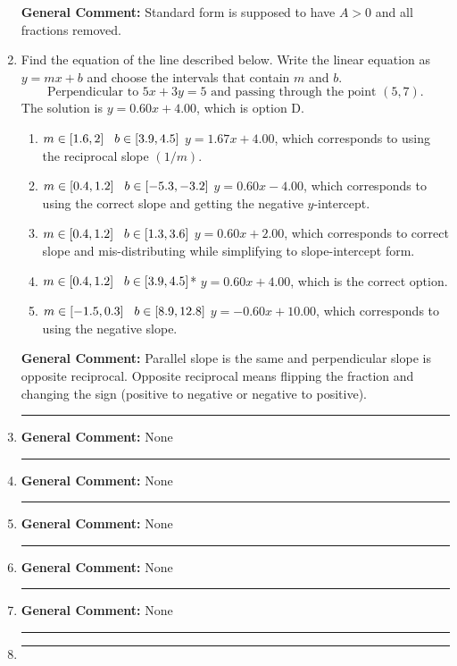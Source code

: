\documentclass{extbook}[14pt]
\newcommand{\litem}[1]{\item#1\hspace*{-1cm}\rule{\textwidth}{0.4pt}}
\begin{document}
\begin{enumerate}
{\textbf{General Comment:} Standard form is supposed to have $A > 0$ and all fractions removed.
}
\litem{
Find the equation of the line described below. Write the linear equation as $ y=mx+b $ and choose the intervals that contain $m$ and $b$.
\[ \text{Perpendicular to } 5 x + 3 y = 5 \text{ and passing through the point } (5, 7). \]
The solution is \( y = 0.60x + 4.00 \), which is option D.\begin{enumerate}[label=\Alph*.]
\item \( m \in [1.6, 2] \hspace*{3mm} b \in [3.9, 4.5] \) $y = 1.67x + 4.00$, which corresponds to using the reciprocal slope $(1/m)$.
\item \( m \in [0.4, 1.2] \hspace*{3mm} b \in [-5.3, -3.2] \) $y = 0.60x - 4.00$, which corresponds to using the correct slope and getting the negative $y$-intercept.
\item \( m \in [0.4, 1.2] \hspace*{3mm} b \in [1.3, 3.6] \) $y = 0.60x + 2.00$, which corresponds to correct slope and mis-distributing while simplifying to slope-intercept form.
\item \( m \in [0.4, 1.2] \hspace*{3mm} b \in [3.9, 4.5] \)* $y = 0.60x + 4.00$, which is the correct option.
\item \( m \in [-1.5, 0.3] \hspace*{3mm} b \in [8.9, 12.8] \) $y = -0.60x + 10.00$, which corresponds to using the negative slope.
\end{enumerate}

\textbf{General Comment:} Parallel slope is the same and perpendicular slope is opposite reciprocal. Opposite reciprocal means flipping the fraction and changing the sign (positive to negative or negative to positive).
}
\litem{



\textbf{General Comment:} None
}
\litem{



\textbf{General Comment:} None
}
\litem{



\textbf{General Comment:} None
}
\litem{



\textbf{General Comment:} None
}
\litem{



\textbf{General Comment:} None
}
\litem{



}
\end{enumerate}
\end{document}
